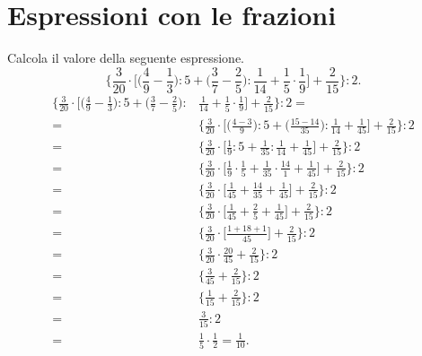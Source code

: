 \section{Espressioni con le frazioni}
\begin{exrig}
\begin{esempio}
  Calcola il valore della seguente espressione.
\[  \bigg\lbrace\frac{3}{20}\cdot\bigg[\bigg(\frac{4}{9}-\frac{1}{3}\bigg):5+ \bigg(\frac{3}{7}-\frac{2}{5}\bigg):%
\frac{1}{14}+\frac{1}{5}\cdot\frac{1}{9}\bigg]+\frac{2}{15}\bigg\rbrace:2.\]
\begin{align*}
  \bigg\lbrace\frac{3}{20}\cdot\bigg[\bigg(\frac{4}{9}-\frac{1}{3}\bigg):5 + \bigg(\frac{3}{7}-\frac{2}{5}\bigg):&%
\frac{1}{14}+\frac{1}{5}\cdot\frac{1}{9}\bigg]+\frac{2}{15}\bigg\rbrace:2= \\
=&
\bigg\lbrace\frac{3}{20}\cdot\bigg[\bigg(\frac{4-3}{9}\bigg):5+\bigg(\frac{15-14}{35}\bigg):\frac{1}{14}+\frac{1}{45}\bigg]%
+\frac{2}{15}\bigg\rbrace:2\\
=&
\bigg\lbrace\frac{3}{20}\cdot\bigg[\frac{1}{9}:5+\frac{1}{35}:\frac{1}{14}+\frac{1}{45}\bigg]+\frac{2}{15}\bigg\rbrace:2\\
=&
\bigg\lbrace\frac{3}{20}\cdot\bigg[\frac{1}{9}\cdot\frac{1}{5}+\frac{1}{35}\cdot\frac{14}{1}+\frac{1}{45}\bigg]+\frac{2}{15}\bigg\rbrace:2\\
=&
 \bigg\lbrace\frac{3}{20}\cdot\bigg[\frac{1}{45}+\frac{14}{35}+\frac{1}{45}\bigg]+%
 \frac{2}{15}\bigg\rbrace:2\\
=&
\bigg\lbrace\frac{3}{20}\cdot\bigg[\frac{1}{45}+\frac{2}{5}+\frac{1}{45}\bigg]+\frac{2}{15}\bigg\rbrace:2\\
=&
\bigg\lbrace\frac{3}{20}\cdot\bigg[\frac{1+18+1}{45}\bigg]+\frac{2}{15}\bigg\rbrace:2\\
=&
\bigg\lbrace\frac{3}{20}\cdot\frac{20}{45}+\frac{2}{15}\bigg\rbrace:2\\
=&
\bigg\lbrace\frac{3}{45}+\frac{2}{15}\bigg\rbrace:2\\
=&
\bigg\lbrace\frac{1}{15}+\frac{2}{15}\bigg\rbrace:2\\
=&
\frac{3}{15}:2\\
=&
\frac{1}{5}\cdot\frac{1}{2}=\frac{1}{10}.
\end{align*}
\end{esempio}


\end{exrig}
